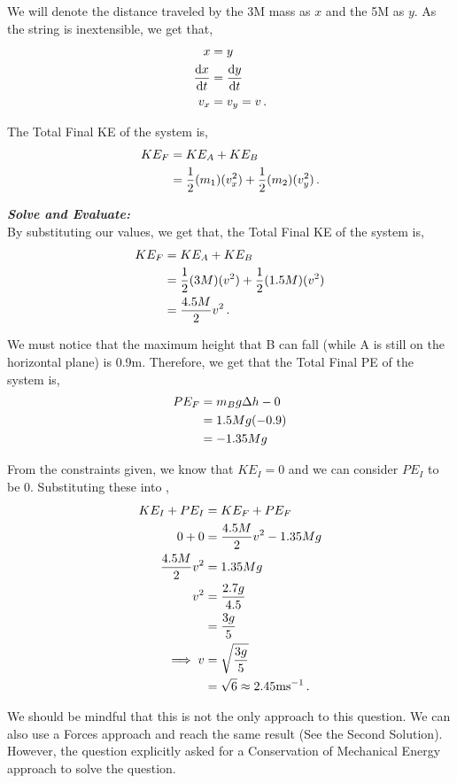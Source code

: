 \begin{subquestions}
We will denote the distance traveled by the 3M mass as $x$ and the 5M as $y$. As the string is inextensible, we get that,
\begin{align}
	x & = y \nonumber \\
	\frac{\mathrm{d}x}{\mathrm{d}t} & = \frac{\mathrm{d}y}{\mathrm{d}t} \nonumber \\
	v_x & = v_y = v \,.
\end{align}

The Total Final KE of the system is,
\begin{align}
	KE_F & = KE_A + KE_B \nonumber \\
	     & = \frac{1}{2}(m_1)(v_x^2) + \frac{1}{2}(m_2)(v_y^2) \,.
\end{align}




\textbf{\textit{Solve and Evaluate:}} \\
By substituting our values, we get that, the Total Final KE of the system is,
\begin{align}
	KE_F & = KE_A + KE_B \nonumber \\
	& = \frac{1}{2}(3M)(v^2) + \frac{1}{2}(1.5M)(v^2) \nonumber \\
	& = \frac{4.5M}{2}v^2 \,.
\end{align}


We must notice that the maximum height that B can fall (while A is still on the horizontal plane) is 0.9m. Therefore, we get that the Total Final PE of the system is,
\begin{align}
	PE_F &  = m_Bg\Delta h - 0 \nonumber \\
	& = 1.5Mg(-0.9) \nonumber \\
	& = -1.35Mg
\end{align}


From the constraints given, we know that $KE_I=0$ and we can consider $PE_I$ to be 0. Substituting these into , 
\begin{align}
	KE_I + PE_I & = KE_F + PE_F \nonumber \\
	0 + 0 & = \frac{4.5M}{2}v^2 - 1.35Mg \nonumber \\
	\frac{4.5M}{2}v^2 & = 1.35Mg \nonumber \\
	v^2 & = \frac{2.7g}{4.5} \nonumber \\
	    & = \frac{3g}{5} \nonumber \\
	    \implies v & = \sqrt{\frac{3g}{5}} \nonumber \\
	               & = \sqrt{6} \approx 2.45 \text{ms}^{-1} \,.
\end{align}

We should be mindful that this is not the only approach to this question. We can also use a Forces approach and reach the same result (See the Second Solution). However, the question explicitly asked for a Conservation of Mechanical Energy approach to solve the question.
	

\end{subquestions}
